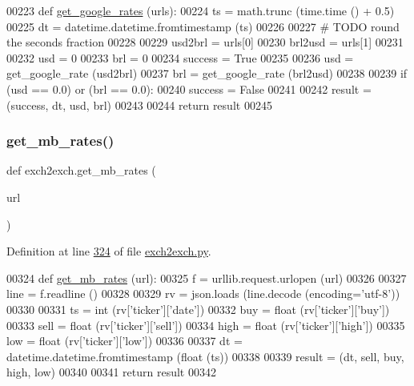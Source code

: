 \begin{DoxyCode}
00223 \textcolor{keyword}{def }\hyperlink{namespaceexch2exch_ae0891a93a4a9cfe932011afddd41808d}{get\_google\_rates} (urls):
00224     ts = math.trunc (time.time () + 0.5)
00225     dt = datetime.datetime.fromtimestamp (ts)
00226     
00227     \textcolor{comment}{# TODO round the seconds fraction}
00228     
00229     usd2brl = urls[0]
00230     brl2usd = urls[1]
00231     
00232     usd = 0
00233     brl = 0
00234     success = \textcolor{keyword}{True}
00235     
00236     usd = get\_google\_rate (usd2brl)
00237     brl = get\_google\_rate (brl2usd)
00238     
00239     \textcolor{keywordflow}{if} (usd == 0.0) \textcolor{keywordflow}{or} (brl == 0.0):
00240         success = \textcolor{keyword}{False} 
00241         
00242     result = (success, dt, usd, brl)
00243     
00244     \textcolor{keywordflow}{return} result
00245         
\end{DoxyCode}
\mbox{\label{namespaceexch2exch_a4226f3cef9fff15993d8b230a5cb92e4}} 
\subsubsection{\texorpdfstring{get\+\_\+mb\+\_\+rates()}{get\_mb\_rates()}}
{\footnotesize\ttfamily def exch2exch.\+get\+\_\+mb\+\_\+rates (\begin{DoxyParamCaption}\item[{}]{url }\end{DoxyParamCaption})}



Definition at line \hyperlink{exch2exch_8py_source_l00324}{324} of file \hyperlink{exch2exch_8py_source}{exch2exch.\+py}.


\begin{DoxyCode}
00324 \textcolor{keyword}{def }\hyperlink{namespaceexch2exch_a4226f3cef9fff15993d8b230a5cb92e4}{get\_mb\_rates} (url):
00325     f = urllib.request.urlopen (url)
00326     
00327     line = f.readline ()
00328     
00329     rv = json.loads (line.decode (encoding=\textcolor{stringliteral}{'utf-8'}))
00330     
00331     ts   = int   (rv[\textcolor{stringliteral}{'ticker'}][\textcolor{stringliteral}{'date'}])
00332     buy  = float (rv[\textcolor{stringliteral}{'ticker'}][\textcolor{stringliteral}{'buy'}])
00333     sell = float (rv[\textcolor{stringliteral}{'ticker'}][\textcolor{stringliteral}{'sell'}])
00334     high = float (rv[\textcolor{stringliteral}{'ticker'}][\textcolor{stringliteral}{'high'}])
00335     low  = float (rv[\textcolor{stringliteral}{'ticker'}][\textcolor{stringliteral}{'low'}])
00336     
00337     dt = datetime.datetime.fromtimestamp (float (ts))
00338     
00339     result = (dt, sell, buy, high, low)
00340     
00341     \textcolor{keywordflow}{return} result
00342 
\end{DoxyCode}
\mbox{\label{namespaceexch2exch_a157dc1519ab4a24783fab8bf7db9c17e}} 

